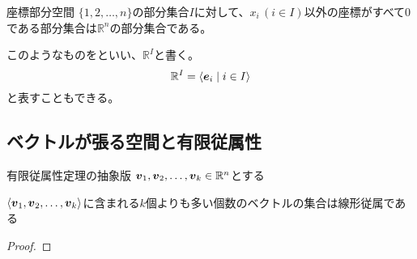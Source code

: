 \documentclass[../../../topic_linear-algebra]{subfiles}
\begin{document}
\begin{definition}{座標部分空間}
  $\{1, 2, \dots, n\}$の部分集合$I$に対して、$x_i \, (i \in I)$以外の座標がすべて0である部分集合は$\mathbb{R}^n$の部分集合である。

  このようなものをといい、$\mathbb{R}^I$と書く。
  \begin{equation*}
    \mathbb{R}^I = \langle \vb*{e}_i \mid i \in I \rangle
  \end{equation*}
  と表すこともできる。
\end{definition}

\subsection{ベクトルが張る空間と有限従属性}

\begin{theorem}{有限従属性定理の抽象版}\label{thm:abstract-finite-dependency}
  $\vb*{v}_1, \vb*{v}_2, \dots, \vb*{v}_k \in \mathbb{R}^n$とする

  $\langle \vb*{v}_1, \vb*{v}_2, \dots, \vb*{v}_k \rangle$に含まれる$k$個よりも多い個数のベクトルの集合は線形従属である
\end{theorem}

\begin{proof}
\end{proof}
\end{document}
